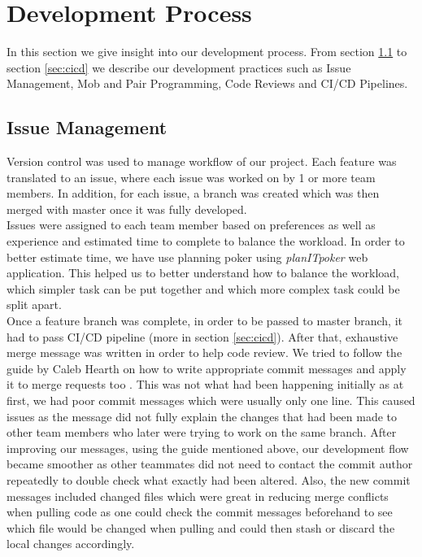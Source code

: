 \documentclass{l3proj}
\begin{document}
\newpage
\section{Development Process}
\label{sec:dev_process}
    In this section we give insight into our development process. 
    From section \ref{sec:version_control} to section \ref{sec:cicd} we describe our development practices such as Issue Management, Mob and Pair Programming, Code Reviews and CI/CD Pipelines.
        
    \subsection{Issue Management}
    \label{sec:version_control}
        Version control was used to manage workflow of our project. Each feature was translated to an issue, where each issue was worked on by 1 or more team members. In addition, for each issue, a branch was created which was then merged with master once it was fully developed.\\
        Issues were assigned to each team member based on preferences as well as experience and estimated time to complete to balance the workload. In order to better estimate time, we have use planning poker using \textit{planITpoker} \cite{poker} web application. This helped us to better understand how to balance the workload, which simpler task can be put together and which more complex task could be split apart.\\
        Once a feature branch was complete, in order to be passed to master branch, it had to pass CI/CD pipeline (more in section \ref{sec:cicd}). After that, exhaustive merge message was written in order to help code review. We tried to follow the guide by Caleb Hearth on how to write appropriate commit messages and apply it to merge requests too \cite{commit}. This was not what had been happening initially as at first, we had poor commit messages which were usually only one line. This caused issues as the message did not fully explain the changes that had been made to other team members who later were trying to work on the same branch. After improving our messages, using the guide mentioned above, our development flow became smoother as other teammates did not need to contact the commit author repeatedly to double check what exactly had been altered. Also, the new commit messages included changed files which were great in reducing merge conflicts when pulling code as one could check the commit messages beforehand to see which file would be changed when pulling and could then stash or discard the local changes accordingly.\\
\end{document}
